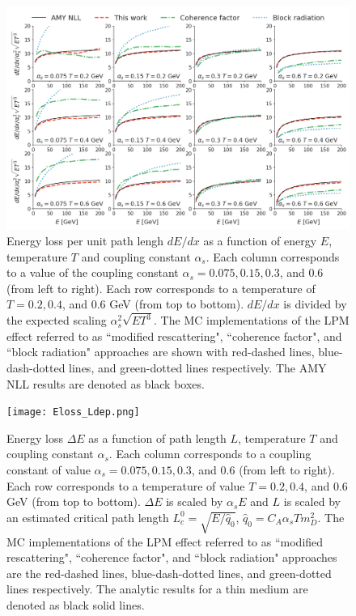 \documentclass[aps, prc, reprint, amsmath, groupedaddress, nofootinbib]{revtex4-1}
\begin{document}
\begin{figure}
\includegraphics[width=\textwidth]{Eloss_infinite.png}
\caption{Energy loss per unit path lengh $dE/dx$ as a function of energy $E$, temperature $T$ and coupling constant $\alpha_s$. Each column corresponds to a value of the coupling constant $\alpha_s = 0.075, 0.15, 0.3$, and $0.6$ (from left to right). Each row corresponds to a temperature of $T = 0.2, 0.4$, and $0.6$ GeV (from top to bottom). $dE/dx$ is divided by the expected scaling $\alpha_s^2 \sqrt{ET^3}$. The MC implementations of the LPM effect referred to as ``modified rescattering", ``coherence factor", and ``block radiation" approaches are shown with red-dashed lines, blue-dash-dotted lines, and green-dotted lines respectively. The AMY NLL results are denoted as black boxes.}
\label{fig:eloss-inf}
\end{figure}

\begin{figure}
\texttt{[image: Eloss\_Ldep.png]}
\caption{Energy loss $\Delta E$ as a function of path length $L$, temperature $T$ and coupling constant $\alpha_s$. Each column corresponds to a coupling constant of value $\alpha_s = 0.075, 0.15, 0.3$, and $0.6$ (from left to right). Each row corresponds to a temperature of value $T = 0.2, 0.4$, and $0.6$ GeV (from top to bottom). $\Delta E$ is scaled by $\alpha_s E$ and $L$ is scaled by an estimated critical path length $L_c^0 = \sqrt{E/\hat{q}_0}$, $\hat{q}_0 = C_A \alpha_s T m_D^2$. The MC implementations of the LPM effect referred to as ``modified rescattering", ``coherence factor", and ``block radiation" approaches are the red-dashed lines, blue-dash-dotted lines, and green-dotted lines respectively. The analytic results for a thin medium are denoted as black solid lines.}
\label{fig:eloss-ldep}
\end{figure}
\end{document}
